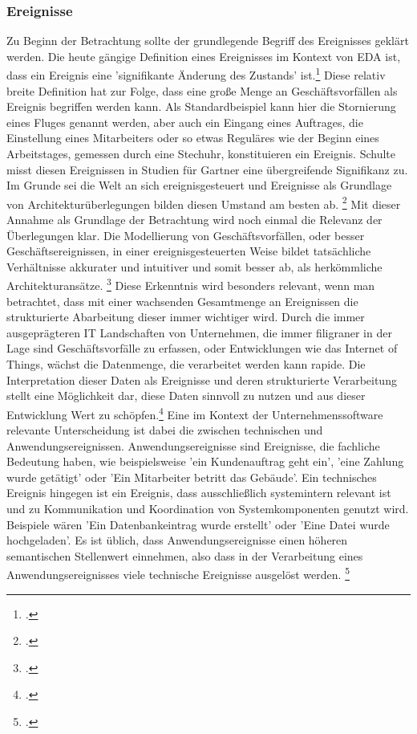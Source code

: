 \subsubsection*{Ereignisse}
Zu Beginn der Betrachtung sollte der grundlegende Begriff des Ereignisses geklärt werden. Die heute gängige Definition eines Ereignisses im Kontext von \ac*{EDA} ist, dass ein Ereignis eine 'signifikante Änderung des Zustands' ist.\footcite[Vgl.][S. 4]{EDA2006} Diese relativ breite Definition hat zur Folge, dass eine große Menge an Geschäftsvorfällen als Ereignis begriffen werden kann. Als Standardbeispiel kann hier die Stornierung eines Fluges genannt werden, aber auch ein Eingang eines Auftrages, die Einstellung eines Mitarbeiters oder so etwas Reguläres wie der Beginn eines Arbeitstages, gemessen durch eine Stechuhr, konstituieren ein Ereignis. Schulte misst diesen Ereignissen in Studien für Gartner eine übergreifende Signifikanz zu. Im Grunde sei die Welt an sich ereignisgesteuert und Ereignisse als Grundlage von Architekturüberlegungen bilden diesen Umstand am besten ab. \footcite[Vgl. ][S. 2]{schulte2003growing} Mit dieser Annahme als Grundlage der Betrachtung wird noch einmal die Relevanz der Überlegungen klar. Die Modellierung von Geschäftsvorfällen, oder besser Geschäftsereignissen, in einer ereignisgesteuerten Weise bildet tatsächliche Verhältnisse akkurater und intuitiver und somit besser ab, als herkömmliche Architekturansätze. \footcite[Vgl. ][S. 13]{EDA2010} Diese Erkenntnis wird besonders relevant, wenn man betrachtet, dass mit einer wachsenden Gesamtmenge an Ereignissen die strukturierte Abarbeitung dieser immer wichtiger wird. Durch die immer ausgeprägteren \ac{IT} Landschaften von Unternehmen, die immer filigraner in der Lage sind Geschäftsvorfälle zu erfassen, oder Entwicklungen wie das Internet of Things, wächst die Datenmenge, die verarbeitet werden kann rapide. Die Interpretation dieser Daten als Ereignisse und deren strukturierte Verarbeitung stellt eine Möglichkeit dar, diese Daten sinnvoll zu nutzen und aus dieser Entwicklung Wert zu schöpfen.\footcite[Vgl. ][S. 16]{EDA2010} 
Eine im Kontext der Unternehmenssoftware relevante Unterscheidung ist dabei die zwischen technischen und Anwendungsereignissen. Anwendungsereignisse sind Ereignisse, die fachliche Bedeutung haben, wie beispielsweise 'ein Kundenauftrag geht ein', 'eine Zahlung wurde getätigt' oder 'Ein Mitarbeiter betritt das Gebäude'. Ein technisches Ereignis hingegen ist ein Ereignis, dass ausschließlich systemintern relevant ist und zu Kommunikation und Koordination von Systemkomponenten genutzt wird. Beispiele wären 'Ein Datenbankeintrag wurde erstellt' oder 'Eine Datei wurde hochgeladen'. Es ist üblich, dass Anwendungsereignisse einen höheren semantischen Stellenwert einnehmen, also dass in der Verarbeitung eines Anwendungsereignisses viele technische Ereignisse ausgelöst werden. \footcite[Vgl. ][S. 245f]{CLOUD2021}
